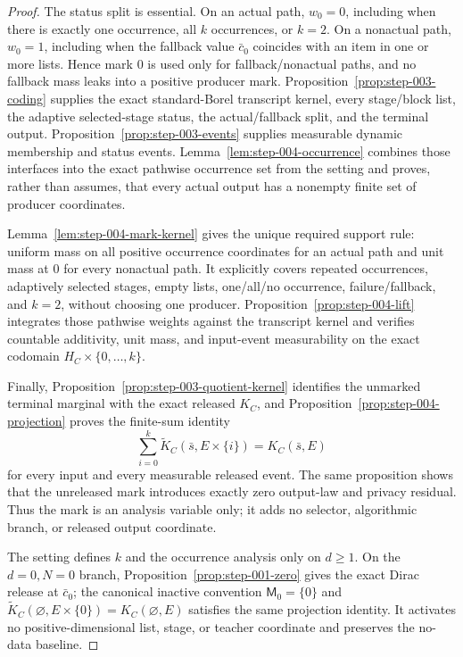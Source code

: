 \begin{proof}
The status split is essential. On an actual path, \(w_0=0\), including when
there is exactly one occurrence, all \(k\) occurrences, or \(k=2\). On a
nonactual path, \(w_0=1\), including when the fallback value \(\bar c_0\)
coincides with an item in one or more lists. Hence mark \(0\) is used only
for fallback/nonactual paths, and no fallback mass leaks into a positive
producer mark. 
Proposition~\ref{prop:step-003-coding} supplies the exact
standard-Borel transcript kernel, every stage/block list, the adaptive
selected-stage status, the actual/fallback split, and the terminal output.
Proposition~\ref{prop:step-003-events} supplies measurable dynamic
membership and status events. Lemma~\ref{lem:step-004-occurrence} combines
those  interfaces into the exact pathwise occurrence set from the
setting and proves, rather than assumes, that every actual output has a
nonempty finite set of producer coordinates.

Lemma~\ref{lem:step-004-mark-kernel} gives the unique required support rule:
uniform mass on all positive occurrence coordinates for an actual path and
unit mass at \(0\) for every nonactual path. It explicitly covers repeated
occurrences, adaptively selected stages, empty lists, one/all/no occurrence,
failure/fallback, and \(k=2\), without choosing one producer.
Proposition~\ref{prop:step-004-lift} integrates those pathwise weights
against the  transcript kernel and verifies countable additivity,
unit mass, and input-event measurability on the exact codomain
\(H_C\times\{0,\ldots,k\}\).

Finally, Proposition~\ref{prop:step-003-quotient-kernel} identifies
the unmarked terminal marginal with the exact released \(K_C\), and
Proposition~\ref{prop:step-004-projection} proves the finite-sum identity
\[
\sum_{i=0}^k
\widetilde K_C(\bar s,E\times\{i\})=K_C(\bar s,E)
\]
for every input and every measurable released event. The same proposition
shows that the unreleased mark introduces exactly zero output-law and
privacy residual. Thus the mark is an analysis variable only; it adds no
selector, algorithmic branch, or released output coordinate.

The setting defines \(k\) and the occurrence analysis only on \(d\geq1\).
On the \(d=0,N=0\) branch, Proposition~\ref{prop:step-001-zero} gives the exact Dirac
release at \(\bar c_0\); the canonical inactive convention
\(\mathsf M_0=\{0\}\) and
\(\widetilde K_C(\varnothing,E\times\{0\})=K_C(\varnothing,E)\) satisfies
the same projection identity. It activates no positive-dimensional list,
stage, or teacher coordinate and preserves the no-data baseline.



\end{proof}

